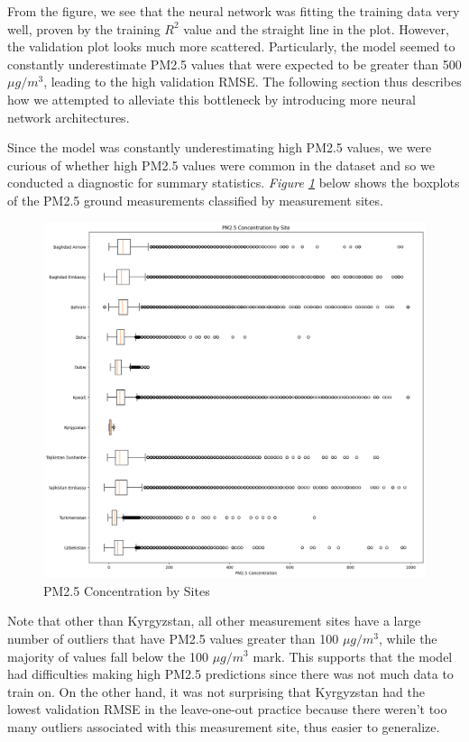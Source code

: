 \documentclass[draft]{agujournal2019}
\begin{document}
From the figure, we see that the neural network was fitting the training data very well, proven by the training \(R^2\) value and the straight line in the plot. However, the validation plot looks much more scattered. Particularly, the model seemed to constantly underestimate PM2.5 values that were expected to be greater than 500 \( \mu g/m^3 \), leading to the high validation RMSE. The following section thus describes how we attempted to alleviate this bottleneck by introducing more neural network architectures.

Since the model was constantly underestimating high PM2.5 values, we were curious of whether high PM2.5 values were common in the dataset and so we conducted a diagnostic for summary statistics. \textit{Figure \ref{fig:summary_stats}} below shows the boxplots of the PM2.5 ground measurements classified by measurement sites.

\begin{figure}[htbp]
    \centering
    \includegraphics[width=\textwidth]{calibration/summary_stats_boxplots.png}
    \caption{PM2.5 Concentration by Sites}
    \label{fig:summary_stats}
\end{figure}

Note that other than Kyrgyzstan, all other measurement sites have a large number of outliers that have PM2.5 values greater than 100 \( \mu g/m^3 \), while the majority of values fall below the 100 \( \mu g/m^3 \) mark. This supports that the model had difficulties making high PM2.5 predictions since there was not much data to train on. On the other hand, it was not surprising that Kyrgyzstan had the lowest validation RMSE in the leave-one-out practice because there weren't too many outliers associated with this measurement site, thus easier to generalize.
\end{document}
